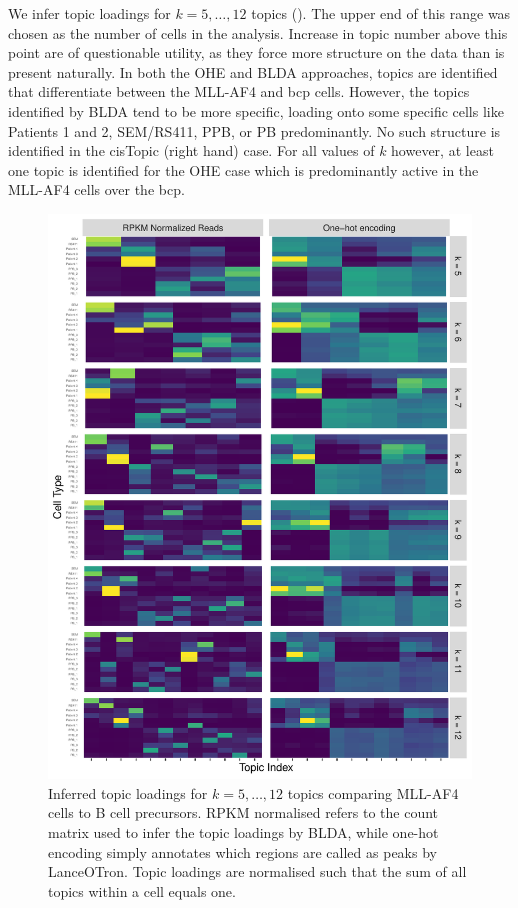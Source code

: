 We infer topic loadings for $k=5,\ldots,12$ topics (). The upper end of this range was chosen as the number of cells in the analysis. Increase in topic number above this point are of questionable utility, as they force more structure on the data than is present naturally.  In both the OHE and BLDA approaches, topics are identified that differentiate between the MLL-AF4 and \gls{bcp} cells. However, the topics identified by BLDA tend to be more specific, loading onto some specific cells like Patients 1 and 2, SEM/RS411, PPB, or PB predominantly. No such structure is identified in the cisTopic (right hand) case. For all values of $k$ however, at least one topic is identified for the OHE case which is predominantly active in the MLL-AF4 cells over the \gls{bcp}.

\begin{figure}
    \centering
    \includegraphics[width=\textwidth]{plot/ch5/mll_redo_topic_mtx.pdf}
    \caption{Inferred topic loadings for $k = 5, \ldots, 12$ topics comparing MLL-AF4 cells to B cell precursors. RPKM normalised refers to the count matrix used to infer the topic loadings by BLDA, while one-hot encoding simply annotates which regions are called as peaks by LanceOTron. Topic loadings are normalised such that the sum of all topics within a cell equals one.}
    \label{fig:mll_all_topic}
\end{figure}

